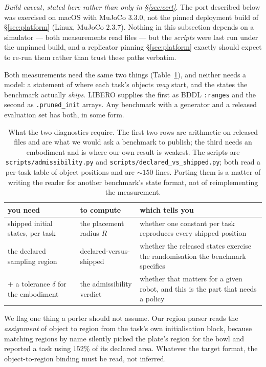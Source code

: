 \documentclass[10pt,twocolumn]{article}
\begin{document}
\noindent\emph{Build caveat, stated here rather than only in
\S\ref{sec:cert}.} The port described below was exercised on macOS with MuJoCo
$3.3.0$, not the pinned deployment build of \S\ref{sec:platform} (Linux, MuJoCo
$2.3.7$). Nothing in this subsection depends on a simulator --- both
measurements read files --- but the \emph{scripts} were last run under the
unpinned build, and a replicator pinning \S\ref{sec:platform} exactly should
expect to re-run them rather than trust these paths verbatim.

Both measurements need the same two things (Table~\ref{tab:portable}), and
neither needs a model: a
statement of where each task's objects \emph{may} start, and the states the
benchmark actually \emph{ships}. LIBERO supplies the first as BDDL
\texttt{:ranges} and the second as \texttt{.pruned\_init} arrays. Any benchmark
with a generator and a released evaluation set has both, in some form.

\begin{table}[h]\centering\footnotesize
\setlength{\tabcolsep}{4pt}
\begin{tabular}{p{2.15cm}p{2.5cm}p{2.6cm}}
\toprule
you need & to compute & which tells you \\
\midrule
shipped initial states, per task &
the placement radius $R$ &
whether one constant per task reproduces every shipped position \\
\addlinespace
the declared sampling region &
declared-versus-shipped &
whether the released states exercise the randomisation the benchmark
specifies \\
\addlinespace
$+$ a tolerance $\delta$ for the embodiment &
the admissibility verdict &
whether that matters for a given robot, and this is the part that needs a
policy \\
\bottomrule
\end{tabular}
\caption{What the two diagnostics require. The first two rows are arithmetic on
released files and are what we would ask a benchmark to publish; the third needs
an embodiment and is where our own result is weakest. The scripts are
\texttt{scripts/admissibility.py} and
\texttt{scripts/declared\_vs\_shipped.py}; both read a per-task table of object
positions and are ${\sim}150$ lines. Porting them is a matter of writing the
reader for another benchmark's state format, not of reimplementing the
measurement.}
\label{tab:portable}
\end{table}

We flag one thing a porter should not assume. Our region parser reads the
\emph{assignment} of object to region from the task's own initialisation block,
because matching regions by name silently picked the plate's region for the
bowl and reported a task using $152\%$ of its declared area. Whatever the
target format, the object-to-region binding must be read, not inferred.
\end{document}
